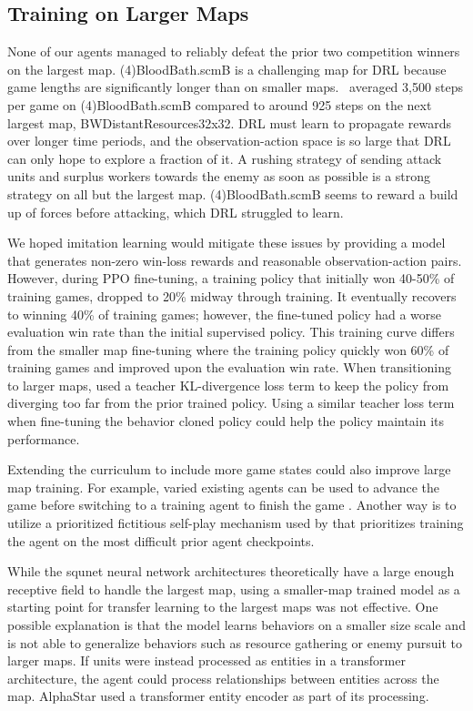 \documentclass[conference]{IEEEtran}
\newcommand{\mapname}[1]{#1} %
\begin{document}
\subsection{Training on Larger Maps}
None of our agents managed to reliably defeat the prior two competition winners on 
the largest map. \mapname{(4)BloodBath.scmB} is a challenging map for DRL because game 
lengths are significantly longer than on smaller
maps. \bcPPOAgent\ averaged 3,500 steps per game on
\mapname{(4)BloodBath.scmB} compared to around 925 steps on the next largest map,
\mapname{BWDistantResources32x32}. DRL must learn to propagate rewards over longer time
periods, and the observation-action space is so large that DRL can only hope to explore a
fraction of it. A rushing strategy of sending attack units and surplus workers towards
the enemy as soon as possible is a strong strategy on all but the largest map.
\mapname{(4)BloodBath.scmB} seems to reward a build up of forces before attacking, which
DRL struggled to learn.

We hoped imitation learning would mitigate these issues by providing a model that
generates non-zero win-loss rewards and reasonable observation-action pairs.
However, during PPO fine-tuning, a training policy that initially won 40-50\% of
training games, dropped to 20\% midway through training. It eventually recovers to
winning 40\% of training games; however, the fine-tuned policy had a worse evaluation
win rate than the initial supervised policy. This training curve differs from the
smaller map fine-tuning where the training policy quickly won 60\% of
training games and improved upon the evaluation win rate. When transitioning to larger 
maps, \cite{Ferdinand2021doublecone} used a teacher KL-divergence loss term to keep the 
policy from diverging too far from the prior trained policy. Using a similar teacher 
loss term when fine-tuning the behavior cloned policy could help the policy maintain its 
performance.

Extending the curriculum to include more game states could also improve large map
training. For example, varied existing agents can be used to advance the game before
switching to a training agent to finish the game \cite{DBLP:conf/icml/UchenduX0ZYSBFM23}.
Another way is to utilize a prioritized fictitious self-play mechanism used by
\cite{Vinyals2019GrandmasterLI} that prioritizes training the agent on the
most difficult prior agent checkpoints.

While the squnet neural network architectures theoretically have a large enough
receptive field to handle the largest map, using a smaller-map trained model as a
starting point for transfer learning to the largest maps was not effective. One possible
explanation is that the model learns behaviors on a smaller size scale and is not able
to generalize behaviors such as resource gathering or enemy pursuit to larger maps. If
units were instead processed as entities in a transformer architecture, the agent could
process relationships between entities across the map. AlphaStar \cite{Vinyals2019GrandmasterLI} used a transformer
entity encoder as part of its processing.
\end{document}
